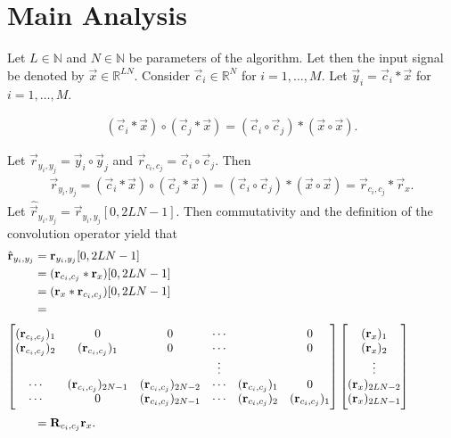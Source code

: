 \documentclass[a4paper, openany, oneside]{memoir}
\begin{document}
\section{Main Analysis}
Let $L \in \mathbb{N}$ and $N \in \mathbb{N}$ be parameters of the algorithm. Let then the input signal be denoted by $\vec{x} \in \mathbb{R}^{LN}$. Consider $\vec{c}_i \in \mathbb{R}^{N}$ for $i = 1,\ldots,M$. Let $\vec{y}_i = \vec{c}_i \ast \vec{x}$ for $i = 1,\ldots,M$.
\begin{theorem} \label{th:conv-corr}
    \begin{align*}
        (\vec{c}_i \ast \vec{x}) \circ (\vec{c}_j \ast \vec{x}) = (\vec{c}_i \circ \vec{c}_j) \ast (\vec{x} \circ \vec{x}).
    \end{align*}
\end{theorem}
Let $\vec{r}_{y_i,y_j} = \vec{y}_i \circ \vec{y}_j$ and $\vec{r}_{c_i,c_j} = \vec{c}_i \circ \vec{c}_j$. Then
\begin{align*}
    \vec{r}_{y_i,y_j} =(\vec{c}_i \ast \vec{x}) \circ (\vec{c}_j \ast \vec{x}) = (\vec{c}_i \circ \vec{c}_j) \ast (\vec{x} \circ \vec{x}) = \vec{r}_{c_i,c_j} \ast \vec{r}_x.
\end{align*}
Let $\hat{\vec{r}}_{y_i,y_j} = \vec{r}_{y_i,y_j}[0,2LN-1]$. Then commutativity and the definition of the convolution operator yield that
\begin{align*}
    \hat{\vec{r}}_{y_i,y_j}
    &= \vec{r}_{y_i,y_j}[0,2LN-1] \\
    &= (\vec{r}_{c_i,c_j} \ast \vec{r}_x)[0,2LN-1] \\
    &= (\vec{r}_x \ast \vec{r}_{c_i,c_j})[0,2LN-1] \\
    &= \hskip \textwidth minus \textwidth \\ %
    \intertext{$\begin{bmatrix}
        (\vec{r}_{c_i,c_j})_1 & 0 & 0& \cdots & &  0 \\
        (\vec{r}_{c_i,c_j})_2 & (\vec{r}_{c_i,c_j})_1 & 0 & \cdots & & 0 \\
        &  & & \vdots &  & \\
        \cdots & (\vec{r}_{c_i,c_j})_{2N-1} & (\vec{r}_{c_i,c_j})_{2N-2} & \cdots & (\vec{r}_{c_i,c_j})_1 & 0 \\
        \cdots & 0 & (\vec{r}_{c_i,c_j})_{2N-1} & \cdots & (\vec{r}_{c_i,c_j})_2 & (\vec{r}_{c_i,c_j})_1 \\
    \end{bmatrix}
    \begin{bmatrix}
        (\vec{r}_x)_1 \\
        (\vec{r}_x)_2 \\
        \vdots \\
        (\vec{r}_x)_{2LN-2} \\
        (\vec{r}_x)_{2LN-1}
    \end{bmatrix}$}
    &= \mat{R}_{c_i,c_j} \vec{r}_x.
\end{align*}
\end{document}
